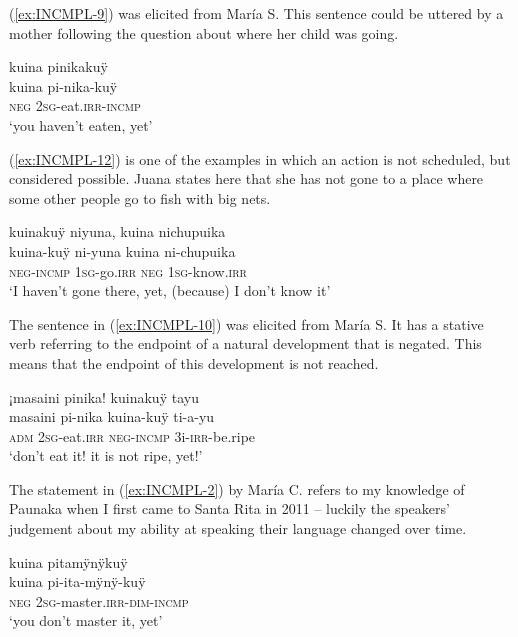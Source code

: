 (\ref{ex:INCMPL-9}) was elicited from María S. This sentence could be uttered by a mother following the question about where her child was going.

\ea\label{ex:INCMPL-9}
\begingl
\glpreamble kuina pinikakuÿ\\
\gla kuina pi-nika-kuÿ\\
\glb \textsc{neg} 2\textsc{sg}-eat.\textsc{irr}-\textsc{incmp}\\
\glft ‘you haven’t eaten, yet’
\endgl
{}
\xe

(\ref{ex:INCMPL-12}) is one of the examples in which an action is not scheduled, but considered possible. Juana states here that she has not gone to a place where some other people go to fish with big nets. 

\ea\label{ex:INCMPL-12}
\begingl
\glpreamble kuinakuÿ niyuna, kuina nichupuika\\
\gla kuina-kuÿ ni-yuna kuina ni-chupuika\\
\glb \textsc{neg}-\textsc{incmp} 1\textsc{sg}-go.\textsc{irr} \textsc{neg} 1\textsc{sg}-know.\textsc{irr}\\
\glft ‘I haven’t gone there, yet, (because) I don’t know it’
\endgl
\trailingcitation{[jxx-e190210s-01]}
\xe

The sentence in (\ref{ex:INCMPL-10}) was elicited from María S. It has a stative verb referring to the endpoint of a natural development that is negated. This means that the endpoint of this development is not reached.

\ea\label{ex:INCMPL-10}
\begingl
\glpreamble ¡masaini pinika! kuinakuÿ tayu\\
\gla masaini pi-nika kuina-kuÿ ti-a-yu\\
\glb \textsc{adm} 2\textsc{sg}-eat.\textsc{irr} \textsc{neg}-\textsc{incmp} 3i-\textsc{irr}-be.ripe\\
\glft ‘don’t eat it! it is not ripe, yet!’
\endgl
\trailingcitation{[rxx-e181022le]}
\xe

The statement in (\ref{ex:INCMPL-2}) by María C. refers to my knowledge of Paunaka when I first came to Santa Rita in 2011 – luckily the speakers’ judgement about my ability at speaking their language changed over time.

\ea\label{ex:INCMPL-2}
\begingl 
\glpreamble kuina pitamÿnÿkuÿ\\
\gla kuina pi-ita-mÿnÿ-kuÿ\\ 
\glb \textsc{neg} 2\textsc{sg}-master.\textsc{irr}-\textsc{dim}-\textsc{incmp}\\ 
\glft ‘you don’t master it, yet’\\ 
\endgl
\trailingcitation{[uxx-p110825l.092]}
\xe

